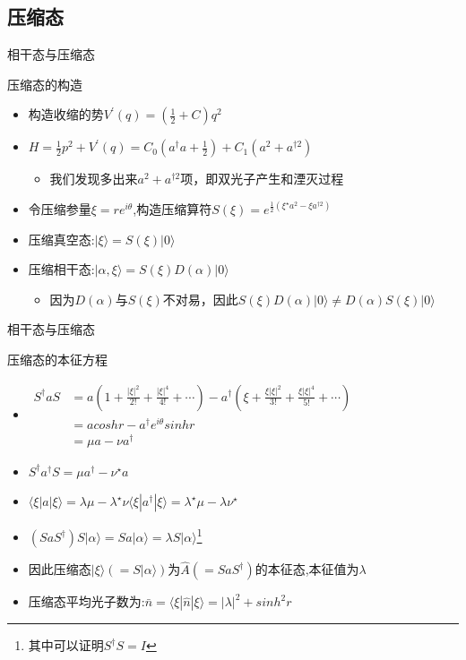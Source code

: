 \documentclass{beamer}
\begin{document}
\subsection{压缩态}
\begin{frame}{相干态与压缩态}
	\begin{block}{压缩态的构造}
		\begin{itemize}
			\item 构造收缩的势$V^{\prime}(q)=(\frac{1}{2}+C)q^{2}$
			\item $H=\frac{1}{2}p^{2}+V^{\prime}(q)=C_{0}(a^{\dagger}a+\frac{1}{2})+C_{1}(a^{2}+a^{\dagger 2})$
			\begin{itemize}
				\item 我们发现多出来$a^{2}+a^{\dagger 2}$项，即双光子产生和湮灭过程
			\end{itemize}
		\item 令压缩参量$\xi=re^{i\theta}$,构造压缩算符$S(\xi)=e^{\frac{1}{2}(\xi^{\star}a^{2}-\xi a^{\dagger 2})}$
		\item 压缩真空态:$|\xi\rangle=S(\xi)|0\rangle$
		\item 压缩相干态:$|\alpha,\xi\rangle=S(\xi)D(\alpha)|0\rangle$
		\begin{itemize}
			\item\footnotesize{因为$D(\alpha)$与$S(\xi)$不对易，因此$S(\xi)D(\alpha)|0\rangle\neq D(\alpha)S(\xi)|0\rangle$} 
		\end{itemize}
		\end{itemize}
	\end{block}
\end{frame}
\begin{frame}{相干态与压缩态}
	\begin{block}{压缩态的本征方程}
		\begin{itemize}
			\item $\begin{aligned}
				S^{\dagger}aS&=a(1+\frac{|\xi|^{2}}{2!}+\frac{|\xi|^{4}}{4!}+\cdots)-a^{\dagger}(\xi+\frac{\xi|\xi|^{2}}{3!}+\frac{\xi|\xi|^{4}}{5!}+\cdots)\\
				&=acoshr-a^{\dagger}e^{i\theta}sinhr\\
				&=\mu a-\nu a^{\dagger}
			\end{aligned}$
		\item $S^{\dagger}a^{\dagger}S=\mu a^{\dagger}-\nu^{\star}a$
		\item $\langle \xi|a|\xi\rangle=\lambda\mu-\lambda^{\star}\nu$\qquad$\langle \xi|a^{\dagger}|\xi\rangle=\lambda^{\star}\mu-\lambda\nu^{\star}$
		\item $(SaS^{\dagger})S|\alpha\rangle=Sa|\alpha\rangle=\lambda S|\alpha\rangle$\footnote{\scriptsize{其中可以证明$S^{\dagger}S=I$}}
		\item\footnotesize{因此压缩态$|\xi\rangle(=S|\alpha\rangle)$为$\hat{A}(=SaS^{\dagger})$的本征态,本征值为$\lambda$} 
		\item 压缩态平均光子数为:$\bar{n}=\langle \xi|\hat{n}|\xi\rangle=|\lambda|^{2}+sinh^{2}r$
		\end{itemize}
	\end{block}
\end{frame}
\end{document}
